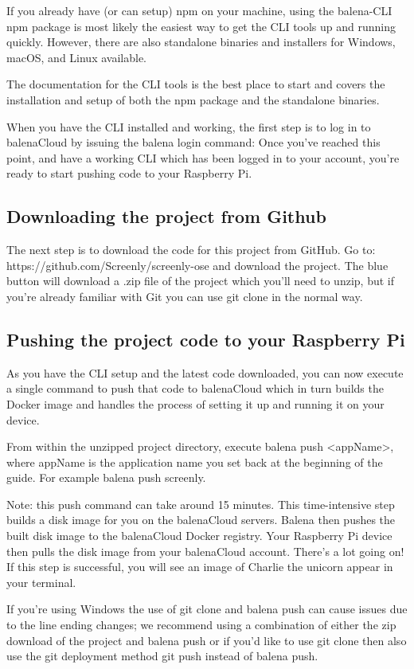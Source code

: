 If you already have (or can setup) npm on your machine, using the balena-CLI npm package is most likely the easiest way to get the CLI tools up and running quickly. However, there are also standalone binaries and installers for Windows, macOS, and Linux available.

The documentation for the CLI tools is the best place to start and covers the installation and setup of both the npm package and the standalone binaries.

When you have the CLI installed and working, the first step is to log in to balenaCloud by issuing the balena login command: Once you’ve reached this point, and have a working CLI which has been logged in to your account, you're ready to start pushing code to your Raspberry Pi.
\subsection*{Downloading the project from Github}

The next step is to download the code for this project from GitHub. Go to: https://github.com/Screenly/screenly-ose and download the project.
The blue button will download a .zip file of the project which you'll need to unzip, but if you're already familiar with Git you can use git clone in the normal way.
\subsection*{Pushing the project code to your Raspberry Pi}

As you have the CLI setup and the latest code downloaded, you can now execute a single command to push that code to balenaCloud which in turn builds the Docker image and handles the process of setting it up and running it on your device.

From within the unzipped project directory, execute balena push <appName>, where appName is the application name you set back at the beginning of the guide. For example balena push screenly.

Note: this push command can take around 15 minutes. This time-intensive step builds a disk image for you on the balenaCloud servers. Balena then pushes the built disk image to the balenaCloud Docker registry. Your Raspberry Pi device then pulls the disk image from your balenaCloud account. There’s a lot going on! If this step is successful, you will see an image of Charlie the unicorn appear in your terminal.

If you're using Windows the use of git clone and balena push can cause issues due to the line ending changes; we recommend using a combination of either the zip download of the project and balena push or if you'd like to use git clone then also use the git deployment method git push instead of balena push.

